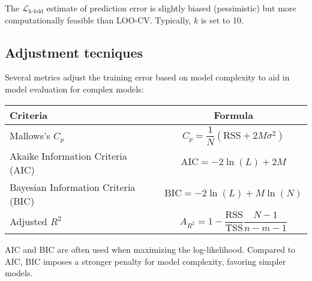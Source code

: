 The $\mathcal{L}_{\text{k-fold}}$ estimate of prediction error is slightly biased (pessimistic) but more computationally feasible than LOO-CV. 
Typically, $k$ is set to 10.

\subsection{Adjustment tecniques}
Several metrics adjust the training error based on model complexity to aid in model evaluation for complex models:
\renewcommand*{\arraystretch}{2}
\begin{table}[H]
    \centering
    \begin{tabular}{|l|c|}
        \hline
        \textbf{Criteria} & \textbf{Formula} \\ \hline
        Mallows's $C_p$ & $C_p=\dfrac{1}{N}\left( \text{RSS}+2M\sigma^2 \right)$ \\ \hline
        Akaike Information Criteria (AIC) & $\text{AIC}=-2\ln(L)+2M$ \\ \hline
        Bayesian Information Criteria (BIC) & $\text{BIC}=-2\ln(L)+M\ln(N)$ \\ \hline
        Adjusted $R^2$ & $A_{R^2}=1-\dfrac{\text{RSS}}{\text{TSS}}\dfrac{N-1}{n-m-1}$ \\ \hline
    \end{tabular}
\end{table}
\renewcommand*{\arraystretch}{1}
AIC and BIC are often used when maximizing the log-likelihood. 
Compared to AIC, BIC imposes a stronger penalty for model complexity, favoring simpler models.